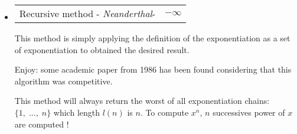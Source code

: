 \begin{itemize}
	\item 	
		\begin{tabularx}{\linewidth}{ p{16cm} p{1.5cm}} 
		Recursive method -
		\textit{Neanderthal}-  & $ - \infty $ \\ 
		\end{tabularx}	
			\noindent
			This method is simply applying the definition of the exponentiation 
			as a set of exponentiation to obtained the desired result. 
	
			Enjoy: some academic paper from 1986 has been found considering that this algorithm 
			was competitive.

			This method will always return the worst of all exponentiation chains:  $\{1, \; ... ,\;n \}$ which length $l(n)$ is $n$.	To compute $x^n$, $n$ successives power of $x$ are computed !

			\vspace{5mm}
\end{itemize}


			
		